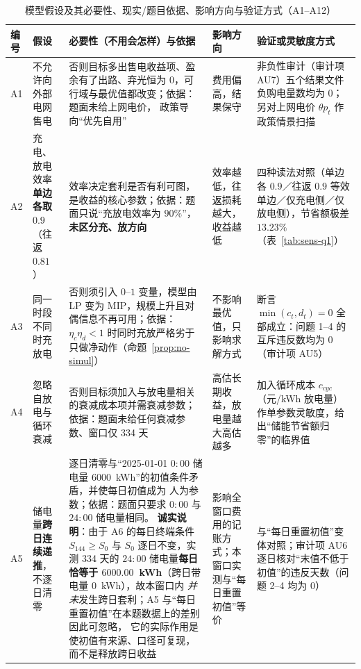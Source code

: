 \begin{table}[htbp]
  \centering
  \caption{模型假设及其必要性、现实/题目依据、影响方向与验证方式（A1--A12）}
  \label{tab:assumptions}
  \scriptsize
  \setlength{\tabcolsep}{3pt}
  \begin{tabularx}{\linewidth}{C{0.62cm} L{2.65cm} L{4.30cm} L{1.95cm} Y}
    \toprule
    编号 & 假设 & 必要性（不用会怎样）与依据 & 影响方向 & 验证或灵敏度方式 \\
    \midrule
    A1 & 不允许向外部电网售电
      & 否则目标多出售电收益项、盈余有了出路、弃光恒为 0，可行域与最优值都改变；依据：题面未给上网电价，
        政策导向“优先自用”
      & 费用偏高，结果保守
      & 非负性审计（审计项 AU7）五个结果文件负购电量数均为 0；另对上网电价 \(\theta p_t\) 作政策情景扫描 \\
    A2 & 充电、放电效率\textbf{单边各取} \(0.9\)（往返 \(0.81\)）
      & 效率决定套利是否有利可图，是收益的核心参数；依据：题面只说“充放电效率为 \(90\%\)”，
        \textbf{未区分充、放方向}
      & 效率越低，往返损耗越大，收益越低
      & 四种读法对照（单边各 \(0.9\)／往返 \(0.9\) 等效单边／仅充电侧／仅放电侧），节省额极差
        \(13.23\%\)（表~\ref{tab:sens-q1}） \\
    A3 & 同一时段不同时充放电
      & 否则须引入 \(0\)--\(1\) 变量，模型由 LP 变为 MIP，规模上升且对偶信息不再可用；依据：
        \(\eta_c\eta_d<1\) 时同时充放严格劣于只做净动作（命题~\ref{prop:no-simul}）
      & 不影响最优值，只影响求解方式
      & 断言 \(\min(c_t,d_t)=0\) 全部成立：问题 1--4 的互斥违反数均为 0（审计项 AU5） \\
    A4 & 忽略自放电与循环衰减
      & 否则目标须加入与放电量相关的衰减成本项并需衰减参数；依据：题面未给任何衰减参数、窗口仅 334 天
      & 高估长期收益，放电量越大高估越多
      & 加入循环成本 \(c_{cyc}\)（元/kWh 放电量）作单参数灵敏度，给出“储能节省额归零”的临界值 \\
    A5 & 储电量\textbf{跨日连续递推}，不逐日清零
      & 逐日清零与“2025-01-01 \(0{:}00\) 储电量 \(6000\)~kWh”的初值条件矛盾，并使每日初值成为
        人为参数；依据：题面只要求 \(0{:}00\) 与 \(24{:}00\) 储电量相同。
        \textbf{诚实说明}：由于 A6 的每日终端条件 \(S_{144}\ge S_0\) 与 \(S_0\) 逐日不变，实测 334 天的
        \(24{:}00\) 储电量\textbf{每日恰等于 \(6000.00\)~kWh}（跨日带电量 \(0\)~kWh），故本窗口内
        \emph{并未}发生跨日套利；A5 与“每日重置初值”在本题数据上的差别因此可忽略，
        它的实际作用是使初值有来源、口径可复现，而不是释放跨日收益
      & 影响全窗口费用的记账方式；本窗口实测与“每日重置初值”等价
      & 与“每日重置初值”变体对照；审计项 AU6 逐日核对“末值不低于初值”的违反天数（问题 2--4 均为 0）

\end{tabularx}
\end{table}
